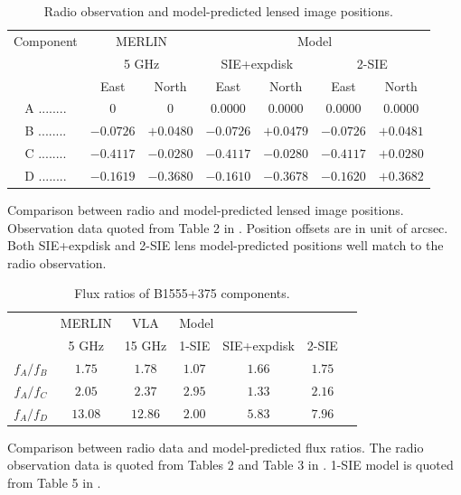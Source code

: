 \documentclass[useAMS,usenatbib]{mn2e}
\begin{document}
\begin{table}
 \begin{minipage}{140mm}
  \caption{Radio observation and model-predicted lensed image positions.}
  \begin{tabular}{@{}ccccccc}

\hline

Component	&\multicolumn{2}{c}{MERLIN} 	 & \multicolumn{4}{c}{Model} \\
					&\multicolumn{2}{c}{5 GHz}		&	\multicolumn{2}{c}{SIE+expdisk} &\multicolumn{2}{c}{ 2-SIE}		\\
					 &East &North &East 		&North &East 		&North\\ 
\hline
A ........ &$0$    		&$0$		&$0.0000$ &$0.0000$   &   $0.0000$   &  $ 0.0000$\\  
B ........ &$-0.0726$ 	&$+0.0480$	&$-0.0726$ &$+0.0479$ & $-0.0726 $  &  $+0.0481$  \\  
C ........ &$-0.4117$  &$-0.0280$	&$-0.4117$ &$-0.0280$  & $-0.4117 $  &   $+0.0280$ \\  
D ........ &$-0.1619$  &$-0.3680$	&$-0.1610$ &$-0.3678$  & $-0.1620$    &  $+0.3682$ \\  
\hline
\end{tabular}

\end{minipage}
\medskip

Comparison between radio and model-predicted lensed image positions. Observation data quoted from Table 2 in \citet{Marlow99}. Position offsets are in unit of arcsec. Both SIE+expdisk and 2-SIE lens model-predicted positions well match to the radio observation.

\end{table}

\begin{table}
  \caption{Flux ratios of B1555+375 components.}
  \begin{tabular}{@{}ccccccc}

\hline
	& MERLIN & VLA & \multicolumn{3}{l}{Model}\\
		&5 GHz & 15 GHz  & 1-SIE & SIE+expdisk & 2-SIE\\
\hline
$f_A/f_B$			&$1.75$ & $1.78$ &$1.07$& $1.66$ & $1.75$ \\ 
$f_A/f_C$		&$2.05$ 	&$2.37$ &$2.95$ & $1.33$ & $2.16$\\
$f_A/f_D$		&$13.08$ &$ 12.86$ &$2.00$& $5.83$ & $7.96$\\

\hline
\end{tabular}

\medskip
Comparison between radio data and model-predicted flux ratios. The radio observation data is quoted from Tables 2 and Table 3 in \citet{Marlow99}. 1-SIE model is quoted from Table 5 in \citet{Marlow99}.

\end{table}
\end{document}
